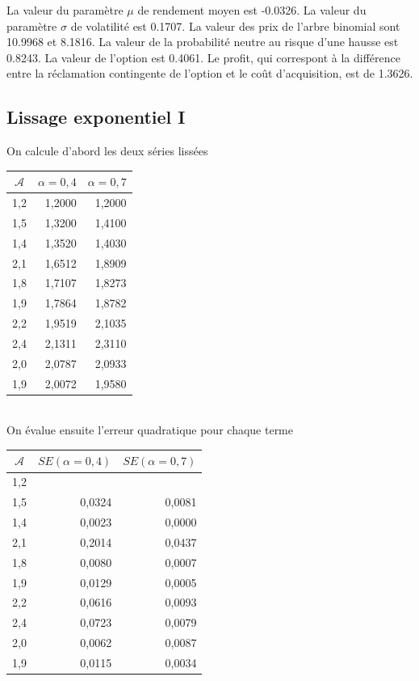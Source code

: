 \documentclass{article}
\begin{document}
La valeur du paramètre $\mu$ de rendement moyen est -0.0326.
La valeur du paramètre $\sigma$ de volatilité est 0.1707.
La valeur des prix de l'arbre binomial sont 10.9968 et 8.1816.
La valeur de la probabilité neutre au risque d'une hausse est 0.8243.
La valeur de l'option est 0.4061.
Le profit, qui correspont à la différence entre la réclamation contingente de l'option et le coût d'acquisition, est de 1.3626.

\clearpage

\subsection{Lissage exponentiel I}

On calcule d'abord les deux séries lissées \\

\begin{tabular}{|l|r|r|}
\hline
\multicolumn{1}{|c|}{$\mathcal{A}$} & $\alpha=0,4$ & $\alpha=0,7$ \\ \hline
1,2 & 1,2000 & 1,2000 \\ \hline
1,5 & 1,3200 & 1,4100 \\ \hline
1,4 & 1,3520 & 1,4030 \\ \hline
2,1 & 1,6512 & 1,8909 \\ \hline
1,8 & 1,7107 & 1,8273 \\ \hline
1,9 & 1,7864 & 1,8782 \\ \hline
2,2 & 1,9519 & 2,1035 \\ \hline
2,4 & 2,1311 & 2,3110 \\ \hline
2,0 & 2,0787 & 2,0933 \\ \hline
1,9 & 2,0072 & 1,9580 \\ \hline
\end{tabular} \\

On évalue ensuite l'erreur quadratique pour chaque terme \\

\begin{tabular}{|l|r|r|}
\hline
\multicolumn{1}{|c|}{$\mathcal{A}$} & \multicolumn{1}{l|}{$SE(\alpha=0,4)$} & \multicolumn{1}{l|}{$SE(\alpha=0,7)$} \\ \hline
1,2 & \multicolumn{1}{l|}{} & \multicolumn{1}{l|}{} \\ \hline
1,5 & 0,0324 & 0,0081 \\ \hline
1,4 & 0,0023 & 0,0000 \\ \hline
2,1 & 0,2014 & 0,0437 \\ \hline
1,8 & 0,0080 & 0,0007 \\ \hline
1,9 & 0,0129 & 0,0005 \\ \hline
2,2 & 0,0616 & 0,0093 \\ \hline
2,4 & 0,0723 & 0,0079 \\ \hline
2,0 & 0,0062 & 0,0087 \\ \hline
1,9 & 0,0115 & 0,0034 \\ \hline
\end{tabular} \\
\end{document}
